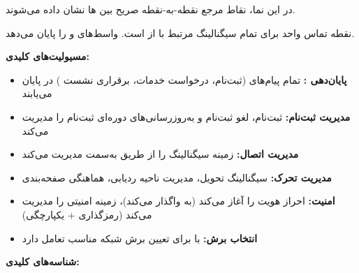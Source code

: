 در این نما، نقاط مرجع نقطه-به-نقطه صریح بین ها نشان داده می‌شوند.




\CNchained{}

 نقطه تماس واحد برای تمام سیگنالینگ مرتبط با  از  است. واسط‌های  و  را پایان می‌دهد.

\textbf{مسیولیت‌های کلیدی:}

\begin{itemize}
\tightlist
\item
  \textbf{پایان‌دهی :} تمام پیام‌های  (ثبت‌نام، درخواست خدمات، برقراری نشست ) در  پایان می‌یابند
\item
  \textbf{مدیریت ثبت‌نام:} ثبت‌نام، لغو ثبت‌نام و به‌روزرسانی‌های دوره‌ای ثبت‌نام  را مدیریت می‌کند
\item
  \textbf{مدیریت اتصال:} زمینه سیگنالینگ  را از طریق  به‌سمت  مدیریت می‌کند
\item
  \textbf{مدیریت تحرک:} سیگنالینگ تحویل، مدیریت ناحیه ردیابی، هماهنگی صفحه‌بندی
\item
  \textbf{امنیت:} احراز هویت را آغاز می‌کند (به  واگذار می‌کند)، زمینه امنیتی  را مدیریت می‌کند (رمزگذاری + یکپارچگی)
\item
  \textbf{انتخاب برش:} با  برای تعیین برش شبکه مناسب تعامل دارد
\end{itemize}


\textbf{شناسه‌های کلیدی:}

